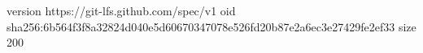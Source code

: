 version https://git-lfs.github.com/spec/v1
oid sha256:6b564f3f8a32824d040e5d60670347078e526fd20b87e2a6ec3e27429fe2ef33
size 200
